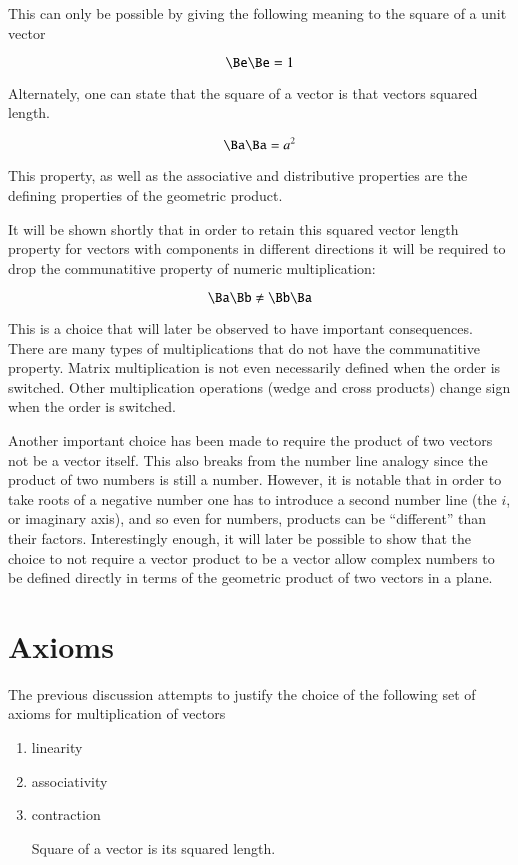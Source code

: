 \documentclass{article}      %
\begin{document}
This can only be possible by giving the following meaning to the square of a unit vector

\[
\Be \Be = 1
\]

Alternately, one can state that the square of a vector is that vectors squared length.

\[
\Ba \Ba = a^2
\]

This property, as well as the associative and distributive properties are the defining properties of the geometric product.  

It will be shown shortly that in order to retain this squared vector length property for vectors with components in different directions it will be required to drop the communatitive property of numeric multiplication:

\[
\Ba \Bb \neq \Bb \Ba
\]

This is a choice that will later be observed to have important consequences.
There are many types of multiplications that do not have the communatitive property.  Matrix multiplication is not even necessarily defined when the order is switched.  Other multiplication operations (wedge and cross products) change sign when the order is switched.

Another important choice has been made to require the product of two vectors not be a vector itself.  This also breaks
from the number line analogy since the product of two numbers is still a number.  However, it is
notable that 
in order to take roots of a negative number one has to introduce a second number line
(the $i$, or imaginary axis), and so even for numbers, products can be ``different'' than their factors.  
Interestingly enough,
it will later be possible to show that the choice to not require a vector product to be a vector
allow complex numbers to be defined directly in terms of the geometric product of two vectors in a plane.

\section{ Axioms }

The previous discussion attempts to justify the choice of the following set of axioms for multiplication of vectors

\begin{enumerate}
\item{ linearity }
\item{ associativity }
\item{ contraction }

Square of a vector is its squared length.
\end{enumerate}
\end{document}
